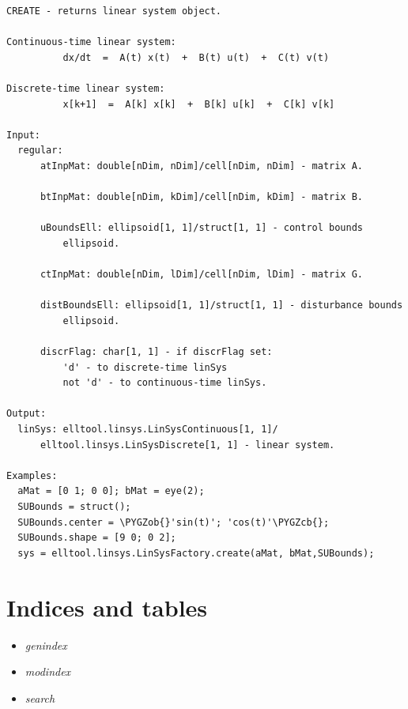 \documentclass[letterpaper,10pt,english]{sphinxmanual}
\def\PYGZob{\char`\{}
\def\PYGZcb{\char`\}}
\begin{document}
\begin{Verbatim}[commandchars=\\\{\}]
CREATE - returns linear system object.

Continuous-time linear system:
          dx/dt  =  A(t) x(t)  +  B(t) u(t)  +  C(t) v(t)

Discrete-time linear system:
          x[k+1]  =  A[k] x[k]  +  B[k] u[k]  +  C[k] v[k]

Input:
  regular:
      atInpMat: double[nDim, nDim]/cell[nDim, nDim] - matrix A.

      btInpMat: double[nDim, kDim]/cell[nDim, kDim] - matrix B.

      uBoundsEll: ellipsoid[1, 1]/struct[1, 1] - control bounds
          ellipsoid.

      ctInpMat: double[nDim, lDim]/cell[nDim, lDim] - matrix G.

      distBoundsEll: ellipsoid[1, 1]/struct[1, 1] - disturbance bounds
          ellipsoid.

      discrFlag: char[1, 1] - if discrFlag set:
          'd' - to discrete-time linSys
          not 'd' - to continuous-time linSys.

Output:
  linSys: elltool.linsys.LinSysContinuous[1, 1]/
      elltool.linsys.LinSysDiscrete[1, 1] - linear system.

Examples:
  aMat = [0 1; 0 0]; bMat = eye(2);
  SUBounds = struct();
  SUBounds.center = \PYGZob{}'sin(t)'; 'cos(t)'\PYGZcb{};
  SUBounds.shape = [9 0; 0 2];
  sys = elltool.linsys.LinSysFactory.create(aMat, bMat,SUBounds);
\end{Verbatim}


\chapter{Indices and tables}
\label{main_manual:indices-and-tables}\begin{itemize}
\item {} 
\emph{genindex}

\item {} 
\emph{modindex}

\item {} 
\emph{search}

\end{itemize}



\renewcommand{\indexname}{Index}
\printindex
\end{document}
